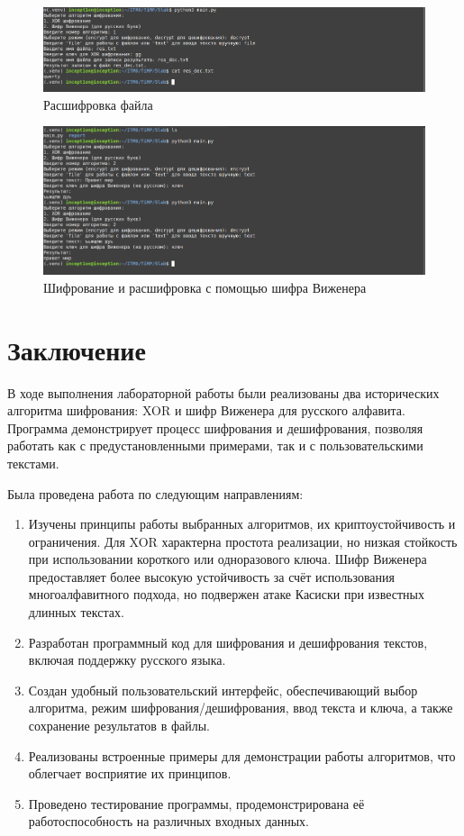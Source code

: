 \documentclass[a4paper, 12pt]{article}
\begin{document}
\begin{figure}[h!]
    \noindent
    \centering
    \includegraphics[width=1\linewidth]{pic_xor_decrypt.png}
    \caption{Расшифровка файла}
\end{figure}

\newpage    
\begin{figure}[h!]
    \noindent
    \centering
    \includegraphics[width=1\linewidth]{pic_second_ciphr.png}
    \caption{Шифрование и расшифровка с помощью шифра Виженера}
\end{figure}




\newpage
\section{Заключение}
В ходе выполнения лабораторной работы были реализованы два исторических алгоритма шифрования: XOR и шифр Виженера для русского алфавита. Программа демонстрирует процесс шифрования и дешифрования, позволяя работать как с предустановленными примерами, так и с пользовательскими текстами.

Была проведена работа по следующим направлениям:
\begin{enumerate}
    \item Изучены принципы работы выбранных алгоритмов, их криптоустойчивость и ограничения. Для XOR характерна простота реализации, но низкая стойкость при использовании короткого или одноразового ключа. Шифр Виженера предоставляет более высокую устойчивость за счёт использования многоалфавитного подхода, но подвержен атаке Касиски при известных длинных текстах.
    \item Разработан программный код для шифрования и дешифрования текстов, включая поддержку русского языка.
    \item Создан удобный пользовательский интерфейс, обеспечивающий выбор алгоритма, режим шифрования/дешифрования, ввод текста и ключа, а также сохранение результатов в файлы.
    \item Реализованы встроенные примеры для демонстрации работы алгоритмов, что облегчает восприятие их принципов.
    \item Проведено тестирование программы, продемонстрирована её работоспособность на различных входных данных.
\end{enumerate}
\end{document}
